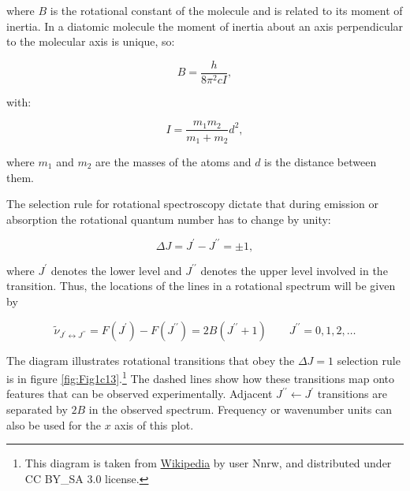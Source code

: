 \documentclass[
  9pt,
]{extbook}
\theoremstyle{definition}
\theoremstyle{definition}
\theoremstyle{definition}
\theoremstyle{remark}
\begin{document}
where \(B\) is the rotational constant of the molecule and is related to its moment of inertia. In a diatomic molecule the moment of inertia about an axis perpendicular to the molecular axis is unique, so:

\begin{equation}
B={\frac{h}{8\pi ^{2}cI}},
\label{eq:rot2}
\end{equation}

with:

\begin{equation}
 I=\frac{m_1m_2}{m_1 +m_2}d^2,
 \label{eq:rot3}
\end{equation}

where \(m_1\) and \(m_2\) are the masses of the atoms and \(d\) is the distance between them.

The selection rule for rotational spectroscopy dictate that during emission or absorption the rotational quantum number has to change by unity:

\begin{equation}
 \Delta J = J^{{\prime }} - J^{{\prime \prime }} = \pm 1,
 \label{eq:rot4}
\end{equation}

where \(J^{{\prime }}\) denotes the lower level and \(J^{{\prime \prime }}\) denotes the upper level involved in the transition. Thus, the locations of the lines in a rotational spectrum will be given by

\begin{equation}
{\tilde  \nu }_{{J^{{\prime }}\leftrightarrow J^{{\prime \prime }}}}=F\left(J^{{\prime }}\right)-F\left(J^{{\prime \prime }}\right)=2B\left(J^{{\prime \prime }}+1\right)\qquad J^{{\prime \prime }}=0,1,2,\ldots
\label{eq:rot5}
\end{equation}

The diagram illustrates rotational transitions that obey the \(\Delta J=1\) selection rule is in figure \ref{fig:Fig1c13}.\footnote{This diagram is taken from \href{https://en.wikipedia.org/wiki/Rotational_spectroscopy\#/media/File:Rotational_spectrum_example.png}{Wikipedia} by user Nnrw, and distributed under CC BY\_SA 3.0 license.} The dashed lines show how these transitions map onto features that can be observed experimentally. Adjacent \(J^{{\prime \prime}}{\leftarrow}J^{{\prime }}\) transitions are separated by \(2B\) in the observed spectrum. Frequency or wavenumber units can also be used for the \(x\) axis of this plot.
\end{document}
